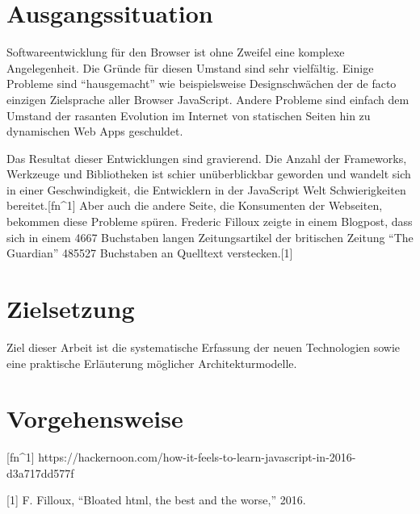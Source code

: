 \section{Ausgangssituation}\label{ausgangssituation}

Softwareentwicklung für den Browser ist ohne Zweifel eine komplexe
Angelegenheit. Die Gründe für diesen Umstand sind sehr vielfältig.
Einige Probleme sind ``hausgemacht'' wie beispielsweise Designschwächen
der de facto einzigen Zielsprache aller Browser JavaScript. Andere
Probleme sind einfach dem Umstand der rasanten Evolution im Internet von
statischen Seiten hin zu dynamischen Web Apps geschuldet.

Das Resultat dieser Entwicklungen sind gravierend. Die Anzahl der
Frameworks, Werkzeuge und Bibliotheken ist schier unüberblickbar
geworden und wandelt sich in einer Geschwindigkeit, die Entwicklern in
der JavaScript Welt Schwierigkeiten bereitet.{[}fn\^{}1{]} Aber auch die
andere Seite, die Konsumenten der Webseiten, bekommen diese Probleme
spüren. Frederic Filloux zeigte in einem Blogpost, dass sich in einem
4667 Buchstaben langen Zeitungsartikel der britischen Zeitung ``The
Guardian'' 485527 Buchstaben an Quelltext verstecken.{[}1{]}

\section{Zielsetzung}\label{zielsetzung}

Ziel dieser Arbeit ist die systematische Erfassung der neuen
Technologien sowie eine praktische Erläuterung möglicher
Architekturmodelle.

\section{Vorgehensweise}\label{vorgehensweise}

{[}fn\^{}1{]}
https://hackernoon.com/how-it-feels-to-learn-javascript-in-2016-d3a717dd577f

\hypertarget{refs}{}
\hypertarget{ref-Filloux2016}{}
{[}1{]} F. Filloux, ``Bloated html, the best and the worse,'' 2016.
